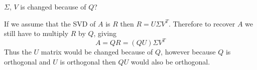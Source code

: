 \begin{enumerate}[label=\arabic*.]
        $\Sigma$, $V$ is changed because of $Q$?
        \begin{mdframed}[style=MyFrame]
            If we assume that the SVD of $A$ is $R$ then $R=U \Sigma V^{T}$.
            Therefore to recover $A$ we still have to multiply $R$ by $Q$,
            giving
            \begin{equation}
                A = QR = \left(QU\right) \Sigma V^{T}
            \end{equation}
            Thus the $U$ matrix would be changed because of $Q$, however
            because $Q$ is orthogonal and $U$ is orthogonal then $QU$ would
            also be orthogonal.
        \end{mdframed}
\end{enumerate}
